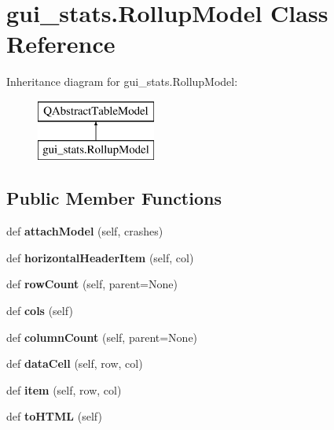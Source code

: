 \hypertarget{classgui__stats_1_1_rollup_model}{}\section{gui\+\_\+stats.\+Rollup\+Model Class Reference}
\label{classgui__stats_1_1_rollup_model}
Inheritance diagram for gui\+\_\+stats.\+Rollup\+Model\+:\begin{figure}[H]
\begin{center}
\leavevmode
\includegraphics[height=2.000000cm]{da/d7c/classgui__stats_1_1_rollup_model}
\end{center}
\end{figure}
\subsection*{Public Member Functions}
\begin{DoxyCompactItemize}
\item 
\mbox{\label{classgui__stats_1_1_rollup_model_a8319c06e0b4963203e41938709530437}} 
def {\bfseries attach\+Model} (self, crashes)
\item 
\mbox{\label{classgui__stats_1_1_rollup_model_a4483db32e137467e333ecfae6b09a4c2}} 
def {\bfseries horizontal\+Header\+Item} (self, col)
\item 
\mbox{\label{classgui__stats_1_1_rollup_model_a8c90402b2e03c9d9701b556dae785ca3}} 
def {\bfseries row\+Count} (self, parent=None)
\item 
\mbox{\label{classgui__stats_1_1_rollup_model_a8e53d654322a4b9c451620797916182c}} 
def {\bfseries cols} (self)
\item 
\mbox{\label{classgui__stats_1_1_rollup_model_af0f07398f58d3c237c534b1692760986}} 
def {\bfseries column\+Count} (self, parent=None)
\item 
\mbox{\label{classgui__stats_1_1_rollup_model_ac4e652923db04475161121b8de4ca2d0}} 
def {\bfseries data\+Cell} (self, row, col)
\item 
\mbox{\label{classgui__stats_1_1_rollup_model_ae79265aaba96f7c2eaf698ec340106d1}} 
def {\bfseries item} (self, row, col)
\item 
\mbox{\label{classgui__stats_1_1_rollup_model_a9f98149cde6e50987ba6096690a6bfa4}} 
def {\bfseries to\+H\+T\+ML} (self)
\end{DoxyCompactItemize}
